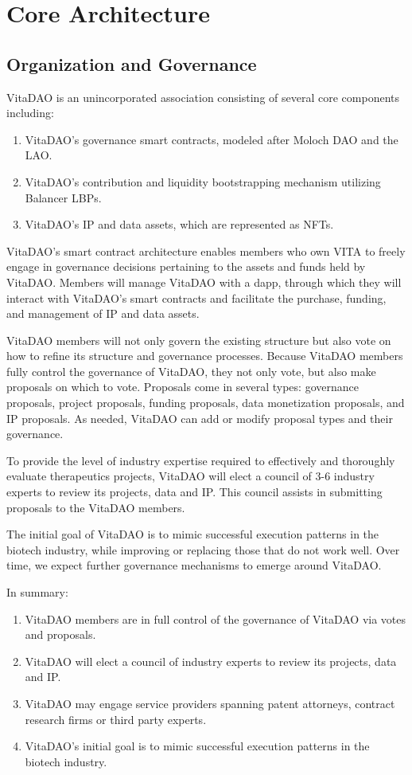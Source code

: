 \documentclass[12pt,letterpaper]{article}
\begin{document}
\section{Core Architecture}

\subsection{Organization and Governance}
VitaDAO is an unincorporated association consisting of several core components including:
\begin{enumerate}
\item VitaDAO’s governance smart contracts, modeled after Moloch DAO and the LAO.
\item VitaDAO’s contribution and liquidity bootstrapping mechanism utilizing Balancer LBPs.
\item VitaDAO’s IP and data assets, which are represented as NFTs.
\end{enumerate}
VitaDAO’s smart contract architecture enables members who own VITA to freely engage in governance decisions pertaining to the assets and funds held by VitaDAO. Members will manage VitaDAO with a dapp, through which they will interact with VitaDAO’s smart contracts and facilitate the purchase, funding, and management of IP and data assets.

VitaDAO members will not only govern the existing structure but also vote on how to refine its structure and governance processes. Because VitaDAO members fully control the governance of VitaDAO, they not only vote, but also make proposals on which to vote. Proposals come in several types: governance proposals, project proposals, funding proposals, data monetization proposals, and IP proposals. As needed, VitaDAO can add or modify proposal types and their governance.

To provide the level of industry expertise required to effectively and thoroughly evaluate therapeutics projects, VitaDAO will elect a council of 3-6 industry experts to review its projects, data and IP. This council assists in submitting proposals to the VitaDAO members.

The initial goal of VitaDAO is to mimic successful execution patterns in the biotech industry, while improving or replacing those that do not work well. Over time, we expect further governance mechanisms to emerge around VitaDAO.

In summary:
\begin{enumerate}
\item VitaDAO members are in full control of the governance of VitaDAO via votes and proposals.
\item VitaDAO will elect a council of industry experts to review its projects, data and IP. 
\item VitaDAO may engage service providers spanning patent attorneys, contract research firms or third party experts.
\item VitaDAO’s initial goal is to mimic successful execution patterns in the biotech industry.
\end{enumerate}
\end{document}
